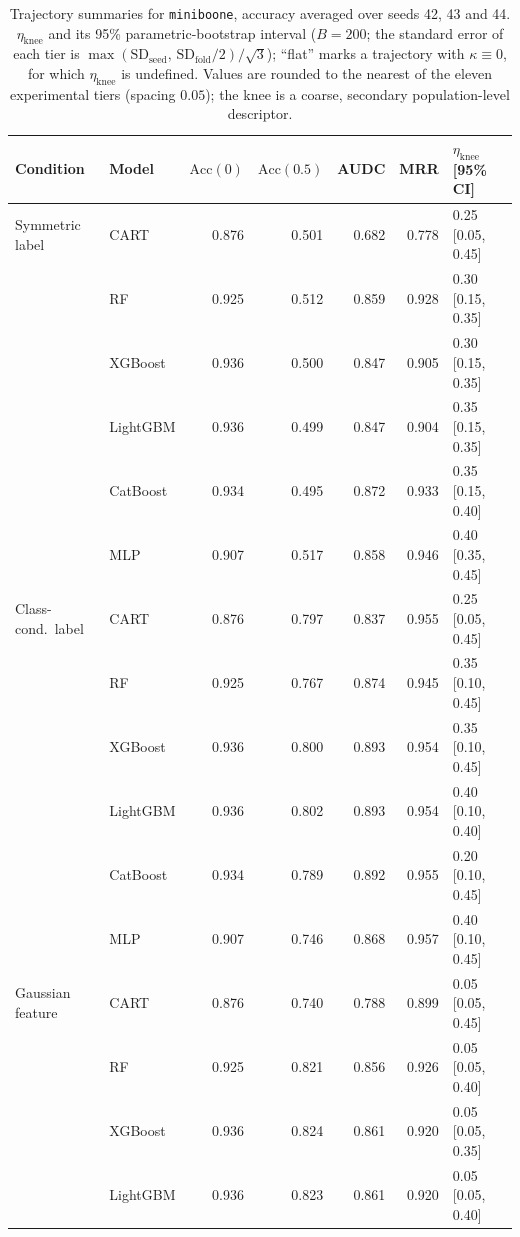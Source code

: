 \begin{table}[p]
\centering
\scriptsize
\setlength{\tabcolsep}{3.5pt}
\caption{Trajectory summaries for \texttt{miniboone}, accuracy averaged over seeds 42, 43 and 44. $\eta_{\mathrm{knee}}$ and its 95\% parametric-bootstrap interval ($B=200$; the standard error of each tier is $\max(\mathrm{SD}_{\mathrm{seed}},\,\mathrm{SD}_{\mathrm{fold}}/2)/\sqrt3$); ``flat'' marks a trajectory with $\kappa\equiv 0$, for which $\eta_{\mathrm{knee}}$ is undefined. Values are rounded to the nearest of the eleven experimental tiers (spacing $0.05$); the knee is a coarse, secondary population-level descriptor.}
\label{tab:traj_miniboone}
\begin{tabular}{@{}llrrrrl@{}}
\toprule
Condition & Model & $\mathrm{Acc}(0)$ & $\mathrm{Acc}(0.5)$ & AUDC & MRR & $\eta_{\mathrm{knee}}$ [95\% CI] \\
\midrule
Symmetric label & CART & 0.876 & 0.501 & 0.682 & 0.778 & 0.25 [0.05, 0.45] \\
 & RF & 0.925 & 0.512 & 0.859 & 0.928 & 0.30 [0.15, 0.35] \\
 & XGBoost & 0.936 & 0.500 & 0.847 & 0.905 & 0.30 [0.15, 0.35] \\
 & LightGBM & 0.936 & 0.499 & 0.847 & 0.904 & 0.35 [0.15, 0.35] \\
 & CatBoost & 0.934 & 0.495 & 0.872 & 0.933 & 0.35 [0.15, 0.40] \\
 & MLP & 0.907 & 0.517 & 0.858 & 0.946 & 0.40 [0.35, 0.45] \\
\midrule
Class-cond.\ label & CART & 0.876 & 0.797 & 0.837 & 0.955 & 0.25 [0.05, 0.45] \\
 & RF & 0.925 & 0.767 & 0.874 & 0.945 & 0.35 [0.10, 0.45] \\
 & XGBoost & 0.936 & 0.800 & 0.893 & 0.954 & 0.35 [0.10, 0.45] \\
 & LightGBM & 0.936 & 0.802 & 0.893 & 0.954 & 0.40 [0.10, 0.40] \\
 & CatBoost & 0.934 & 0.789 & 0.892 & 0.955 & 0.20 [0.10, 0.45] \\
 & MLP & 0.907 & 0.746 & 0.868 & 0.957 & 0.40 [0.10, 0.45] \\
\midrule
Gaussian feature & CART & 0.876 & 0.740 & 0.788 & 0.899 & 0.05 [0.05, 0.45] \\
 & RF & 0.925 & 0.821 & 0.856 & 0.926 & 0.05 [0.05, 0.40] \\
 & XGBoost & 0.936 & 0.824 & 0.861 & 0.920 & 0.05 [0.05, 0.35] \\
 & LightGBM & 0.936 & 0.823 & 0.861 & 0.920 & 0.05 [0.05, 0.40] \\

\end{tabular}
\end{table}
